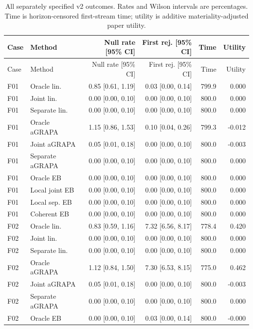 \begingroup\scriptsize\setlength{\tabcolsep}{2.5pt}
\begin{longtable}{llrrrr}
\caption{All separately specified v2 outcomes. Rates and Wilson intervals are percentages. Time is horizon-censored first-stream time; utility is additive materiality-adjusted paper utility.}\label{tab:followup-full}\\
\toprule Case & Method & Null rate [95\% CI] & First rej. [95\% CI] & Time & Utility\\\midrule\endfirsthead
\toprule Case & Method & Null rate [95\% CI] & First rej. [95\% CI] & Time & Utility\\\midrule\endhead
F01 & Oracle lin. & 0.85 [0.61, 1.19] & 0.03 [0.00, 0.14] & 799.9 & 0.000\\
F01 & Joint lin. & 0.00 [0.00, 0.10] & 0.00 [0.00, 0.10] & 800.0 & 0.000\\
F01 & Separate lin. & 0.00 [0.00, 0.10] & 0.00 [0.00, 0.10] & 800.0 & 0.000\\
F01 & Oracle aGRAPA & 1.15 [0.86, 1.53] & 0.10 [0.04, 0.26] & 799.3 & -0.012\\
F01 & Joint aGRAPA & 0.05 [0.01, 0.18] & 0.00 [0.00, 0.10] & 800.0 & -0.003\\
F01 & Separate aGRAPA & 0.00 [0.00, 0.10] & 0.00 [0.00, 0.10] & 800.0 & 0.000\\
F01 & Oracle EB & 0.00 [0.00, 0.10] & 0.00 [0.00, 0.10] & 800.0 & 0.000\\
F01 & Local joint EB & 0.00 [0.00, 0.10] & 0.00 [0.00, 0.10] & 800.0 & 0.000\\
F01 & Local sep. EB & 0.00 [0.00, 0.10] & 0.00 [0.00, 0.10] & 800.0 & 0.000\\
F01 & Coherent EB & 0.00 [0.00, 0.10] & 0.00 [0.00, 0.10] & 800.0 & 0.000\\
F02 & Oracle lin. & 0.83 [0.59, 1.16] & 7.32 [6.56, 8.17] & 778.4 & 0.420\\
F02 & Joint lin. & 0.00 [0.00, 0.10] & 0.00 [0.00, 0.10] & 800.0 & 0.000\\
F02 & Separate lin. & 0.00 [0.00, 0.10] & 0.00 [0.00, 0.10] & 800.0 & 0.000\\
F02 & Oracle aGRAPA & 1.12 [0.84, 1.50] & 7.30 [6.53, 8.15] & 775.0 & 0.462\\
F02 & Joint aGRAPA & 0.05 [0.01, 0.18] & 0.00 [0.00, 0.10] & 800.0 & -0.003\\
F02 & Separate aGRAPA & 0.00 [0.00, 0.10] & 0.00 [0.00, 0.10] & 800.0 & 0.000\\
F02 & Oracle EB & 0.00 [0.00, 0.10] & 0.03 [0.00, 0.14] & 800.0 & -0.000\\

\end{longtable}
